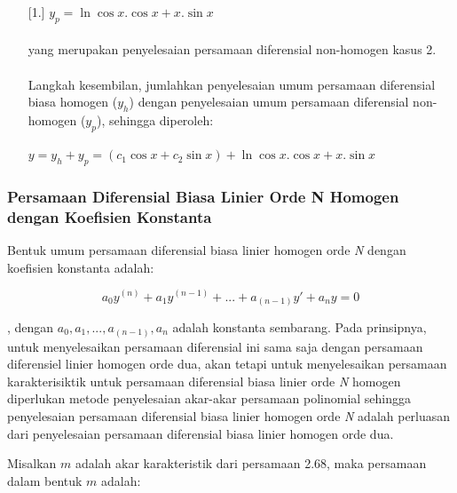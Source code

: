 \begin{enumerate} [1.]
	\begin{math} y_p =\ln \cos x . \cos x + x. \sin x \end{math} \\ \\
	yang merupakan penyelesaian persamaan diferensial non-homogen kasus 2. \\ \\
	Langkah kesembilan, jumlahkan penyelesaian umum persamaan diferensial biasa homogen (\begin{math} y_h \end{math}) dengan penyelesaian umum persamaan diferensial non-homogen (\begin{math} y_p \end{math}), sehingga diperoleh: \\ \\
	\begin{math} y = y_h + y_p = (c_1 \cos x + c_2 \sin x) + \ln \cos x . \cos x + x. \sin x \end{math}

\end{enumerate}

\subsubsection{Persamaan Diferensial Biasa Linier Orde N Homogen dengan Koefisien Konstanta}
\label{parff:PDBLONHKK}

Bentuk umum persamaan diferensial biasa linier homogen orde \textit{N} dengan koefisien konstanta adalah:

\begin{equation} a_0 y^{(n)} + a_1 y^{(n - 1)} + ... + a_(n-1) y' + a_n y = 0 \end{equation}

, dengan \begin{math} a_0, a_1, ..., a_(n -1), a_n \end{math} adalah konstanta sembarang. Pada prinsipnya, untuk menyelesaikan persamaan diferensial ini sama saja dengan persamaan diferensiel linier homogen orde dua, akan tetapi untuk menyelesaikan persamaan karakterisiktik untuk persamaan diferensial biasa linier orde \textit{N} homogen diperlukan metode penyelesaian akar-akar persamaan polinomial sehingga penyelesaian persamaan diferensial biasa linier homogen orde \textit{N} adalah perluasan dari penyelesaian persamaan diferensial biasa linier homogen orde dua.

Misalkan \begin{math} m \end{math} adalah akar karakteristik dari persamaan 2.68, maka persamaan dalam bentuk \begin{math} m \end{math} adalah:

